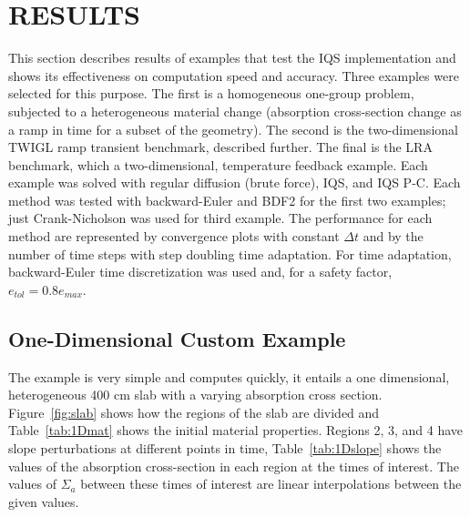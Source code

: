 \documentclass[12pt]{scrartcl}
\newcommand{\fig}[1]{Figure~\ref{#1}}                      %
\newcommand{\tbl}[1]{Table~\ref{#1}}                     %
\begin{document}
\newpage
%
\section{RESULTS} 
\label{sect::results}

This section describes results of examples that test the IQS implementation and shows its effectiveness on computation speed and accuracy.  Three examples were selected for this purpose.  The first is a homogeneous one-group problem, subjected to a heterogeneous material change (absorption cross-section change as a ramp in time for a subset of the geometry).  The second is the two-dimensional TWIGL ramp transient benchmark, described further.  The final is the LRA benchmark, which a two-dimensional, temperature feedback example.  Each example was solved with regular diffusion (brute force), IQS, and IQS P-C.  Each method was tested with backward-Euler and BDF2 for the first two examples; just Crank-Nicholson was used for third example.  The performance for each method are represented by convergence plots with constant $\Delta t$ and by the number of time steps with step doubling time adaptation.  For time adaptation, backward-Euler time discretization was used and, for a safety factor, $e_{tol} = 0.8e_{max}$.

\subsection{One-Dimensional Custom Example}

The example is very simple and computes quickly, it entails a one dimensional, heterogeneous 400 cm slab with a varying absorption cross section.  \fig{fig:slab} shows how the regions of the slab are divided and \tbl{tab:1Dmat} shows the initial material properties.  Regions 2, 3, and 4 have slope perturbations at different points in time, \tbl{tab:1Dslope} shows the values of the absorption cross-section in each region at the times of interest.  The values of $\Sigma_a$ between these times of interest are linear interpolations between the given values.
\end{document}
